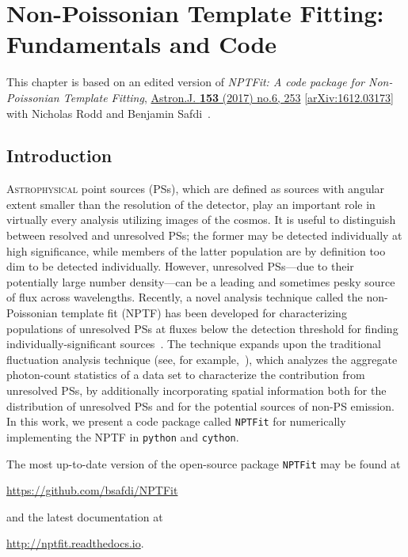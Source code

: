 
\chapter{Non-Poissonian Template Fitting: Fundamentals and Code}
\label{ch:nptfit}

This chapter is based on an edited version of \emph{NPTFit: A code package for Non-Poissonian Template Fitting},  \href{http://iopscience.iop.org/article/10.3847/1538-3881/aa6d5f/meta}{Astron.J. \textbf{153} (2017) no.6, 253}  \href{https://arxiv.org/abs/1612.03173}{ [arXiv:1612.03173]} with Nicholas Rodd and Benjamin Safdi~\cite{Mishra-Sharma:2016gis}.  

\section{Introduction}

\lettrine[lines=3]{A}{strophysical} point sources (PSs), which are defined as sources with angular extent smaller than the resolution of the detector, play an important role in virtually every analysis utilizing images of the cosmos.  It is useful to distinguish between resolved and unresolved PSs; the former may be detected individually at high significance, while members of the latter population are by definition too dim to be detected individually.  However, unresolved PSs---due to their potentially large number density---can be a leading and sometimes pesky source of flux across wavelengths.
  Recently, a novel analysis technique called the non-Poissonian template fit (NPTF) has been developed for characterizing populations of unresolved PSs at fluxes below the detection threshold for finding individually-significant sources~\cite{Lee:2014mza,Lee:2015fea}.  The technique expands upon the traditional fluctuation analysis technique (see, for example,~\cite{Miyaji:2001dp,Malyshev:2011zi}), which analyzes the aggregate photon-count statistics of a data set to characterize the contribution from unresolved PSs, by additionally incorporating spatial information both for the distribution of unresolved PSs and for the potential sources of non-PS emission.  In this work, we present a code package called \texttt{NPTFit} for numerically implementing the NPTF in \texttt{python} and \texttt{cython}.
  
The most up-to-date version of the open-source package \texttt{NPTFit} may be found at
\begin{center}
\url{https://github.com/bsafdi/NPTFit}
\end{center}
and the latest documentation at
\begin{center}
\url{http://nptfit.readthedocs.io}.
\end{center}


